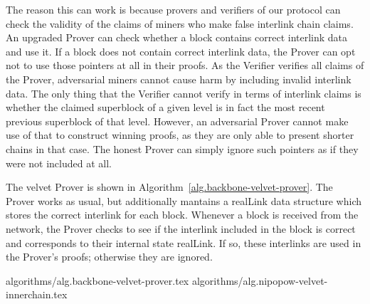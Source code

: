 The reason this can work is because provers and verifiers of our protocol can
check the validity of the claims of miners who make false interlink chain
claims. An upgraded Prover can check whether a block contains correct interlink
data and use it. If a block does not contain correct interlink data, the Prover
can opt not to use those pointers at all in their proofs. As the Verifier
verifies all claims of the Prover, adversarial miners cannot cause harm by
including invalid interlink data. The only thing that the Verifier cannot
verify in terms of interlink claims is whether the claimed superblock of a
given level is in fact the most recent previous superblock of that level.
However, an adversarial Prover cannot make use of that to construct winning
proofs, as they are only able to present shorter chains in that case. The
honest Prover can simply ignore such pointers as if they were not included at
all.

The velvet Prover is shown in Algorithm~\ref{alg.backbone-velvet-prover}. The
Prover works as usual, but additionally mantains a realLink data structure
which stores the correct interlink for each block. Whenever a block is received
from the network, the Prover checks to see if the interlink included in the block is
correct and corresponds to their internal state realLink. If so, these
interlinks are used in the Prover's proofs; otherwise they are ignored.

{algorithms/alg.backbone-velvet-prover.tex}
{algorithms/alg.nipopow-velvet-innerchain.tex}
